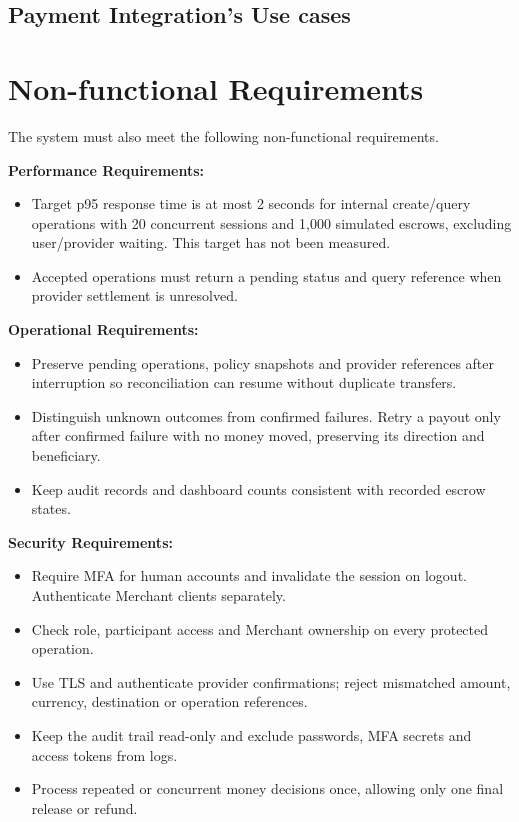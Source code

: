 \subsection{Payment Integration's Use cases}

\section{Non-functional Requirements}
The system must also meet the following non-functional requirements.

\medskip\noindent\textbf{Performance Requirements:}
\begin{itemize}
\item Target p95 response time is at most 2 seconds for internal create/query operations with 20 concurrent sessions and 1,000 simulated escrows, excluding user/provider waiting. This target has not been measured.
\item Accepted operations must return a pending status and query reference when provider settlement is unresolved.
\end{itemize}
\medskip\noindent\textbf{Operational Requirements:}
\begin{itemize}
\item Preserve pending operations, policy snapshots and provider references after interruption so reconciliation can resume without duplicate transfers.
\item Distinguish unknown outcomes from confirmed failures. Retry a payout only after confirmed failure with no money moved, preserving its direction and beneficiary.
\item Keep audit records and dashboard counts consistent with recorded escrow states.
\end{itemize}
\medskip\noindent\textbf{Security Requirements:}
\begin{itemize}
\item Require MFA for human accounts and invalidate the session on logout. Authenticate Merchant clients separately.
\item Check role, participant access and Merchant ownership on every protected operation.
\item Use TLS and authenticate provider confirmations; reject mismatched amount, currency, destination or operation references.
\item Keep the audit trail read-only and exclude passwords, MFA secrets and access tokens from logs.
\item Process repeated or concurrent money decisions once, allowing only one final release or refund.
\end{itemize}
